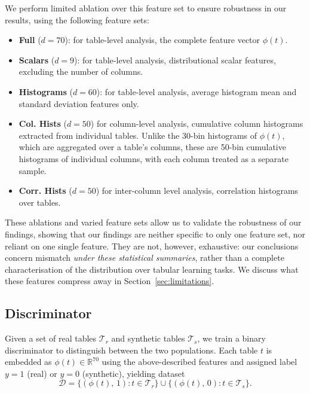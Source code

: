 \documentclass{article}
\begin{document}


We perform limited ablation over this feature set to ensure robustness in our results, using the following feature sets:

\begin{itemize}
    \item \textbf{Full} ($d = 70$): for table-level analysis, the complete feature vector $\phi(t)$.
    \item \textbf{Scalars} ($d = 9$): for table-level analysis, distributional scalar features, excluding the number of columns.
    \item \textbf{Histograms} ($d = 60$): for table-level analysis, average histogram mean and standard deviation features only.
    \item \textbf{Col. Hists} ($d=50$) for column-level analysis, cumulative column histograms extracted from individual tables. Unlike the 30-bin histograms of $\phi(t)$, which are aggregated over a table's columns, these are 50-bin cumulative histograms of individual columns, with each column treated as a separate sample.
    \item \textbf{Corr. Hists} ($d = 50$) for inter-column level analysis, correlation histograms over tables.
\end{itemize}

These ablations and varied feature sets allow us to validate the robustness of our findings, showing that our findings are neither specific to only one feature set, nor reliant on one single feature.
They are not, however, exhaustive: our conclusions concern mismatch \textit{under these statistical summaries}, rather than a complete characterisation of the distribution over tabular learning tasks. We discuss what these features compress away in Section~\ref{sec:limitations}.



\subsection{Discriminator}


Given a set of real tables $\mathcal{T}_r$ and synthetic tables $\mathcal{T}_s$, we train a binary discriminator to distinguish between the two populations. Each table $t$ is embedded as $\phi(t) \in \mathbb{R}^{70}$ using the above-described features and assigned label $y = 1$ (real) or $y = 0$ (synthetic), yielding dataset
\begin{equation}
    \mathcal{D} = \{(\phi(t),\, 1) : t \in \mathcal{T}_r\} \cup \{(\phi(t),\, 0) : t \in \mathcal{T}_s\}.
\end{equation}
\end{document}

